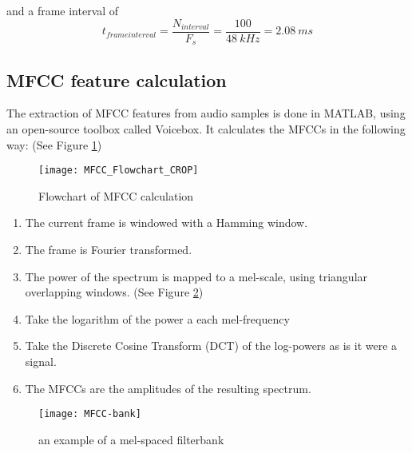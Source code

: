 and a frame interval of
\begin{equation}
t_{frame interval} = \dfrac{N_{interval}}{F_s} = \dfrac{100}{48\ kHz} = 2.08\ ms
\end{equation}
\newpage
\subsection{MFCC feature calculation}
The extraction of MFCC features from audio samples is done in MATLAB, using an open-source toolbox called Voicebox.
It calculates the MFCCs in the following way: (See Figure \ref{fig:mfccFlow})

\begin{figure}[H]
\centering
\texttt{[image: MFCC\_Flowchart\_CROP]}
\caption{Flowchart of MFCC calculation}
\label{fig:mfccFlow}
\end{figure}

\begin{enumerate}

\item
The current frame is windowed with a Hamming window.

\item
The frame is Fourier transformed.

\item
The power of the spectrum is mapped to a mel-scale, using triangular overlapping windows. (See Figure \ref{fig:mfccBank})

\item
Take the logarithm of the power a each mel-frequency

\item
Take the Discrete Cosine Transform (DCT) of the log-powers as is it were a signal.

\item
The MFCCs are the amplitudes of the resulting spectrum.

\end{enumerate}

\begin{figure}[H]
\centering
\texttt{[image: MFCC-bank]}
\caption{an example of a mel-spaced filterbank}
\label{fig:mfccBank}
\end{figure}
